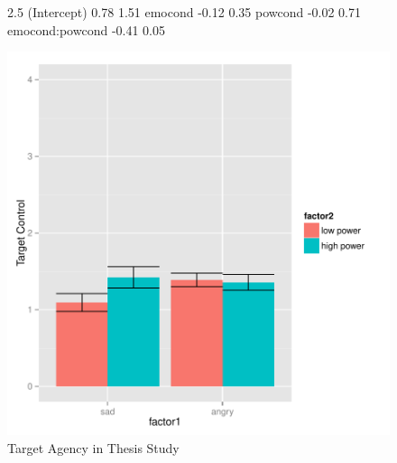 \documentclass[man,apacite,floatsintext]{apa6}
\begin{document}
\begin{figure}
\begin{Schunk}
\begin{Soutput}
                2.5 %
(Intercept)      0.78   1.51
emocond         -0.12   0.35
powcond         -0.02   0.71
emocond:powcond -0.41   0.05
\end{Soutput}
\end{Schunk}
\includegraphics{PowerResults-ThesisTargCont}
\caption{Target Agency in Thesis Study}
\end{figure}
\newpage
\end{document}
